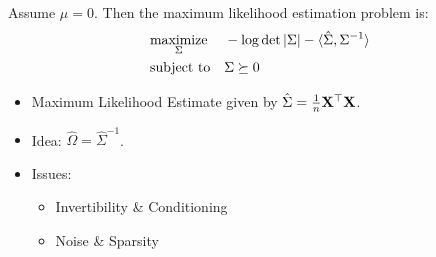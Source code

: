 \begin{frame}[fragile] \frametitle{}
\end{frame}
\begin{frame}[fragile] \frametitle{}

    Assume $\mu = 0$.  Then the maximum likelihood estimation problem is:
	\begin{align*}
		&\underset{\Sigma}{\text{maximize}} && 
			-\log\det|\Sigma| - \langle \hat\Sigma, \Sigma^{-1} \rangle
		\\ &\text{subject to} && \Sigma \succeq 0
	\end{align*}

    \begin{itemize}
        \item Maximum Likelihood Estimate given by $\hat\Sigma = 
            \frac{1}{n} \mathbf{X}^\top \mathbf{X}$.
        \item Idea: $\hat\Omega = \hat\Sigma^{-1}$.
        \item Issues:
            \begin{itemize}
                \item Invertibility \& Conditioning
                \item Noise \& Sparsity
            \end{itemize}
    \end{itemize}
\end{frame}
\begin{frame}[fragile] \frametitle{}
\end{frame}
\begin{frame}[fragile] \frametitle{}
\end{frame}
\begin{frame}[fragile] \frametitle{}
\end{frame}
\begin{frame}[fragile] \frametitle{}


\end{frame}
